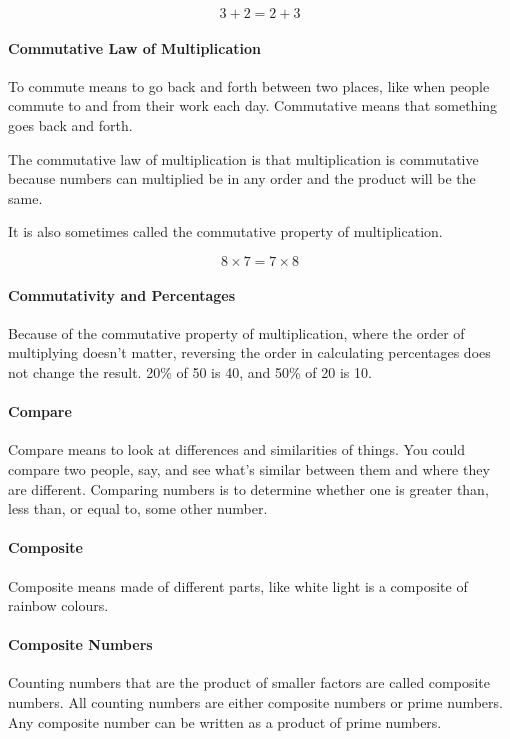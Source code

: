 \documentclass[12pt]{article}
\begin{document}
$$3+2=2+3$$

\paragraph{Commutative Law of Multiplication}

To commute means to go back and forth between two places, like when people commute to and from their work each day. Commutative means that something goes back and forth.

The commutative law of multiplication is that multiplication is commutative because numbers can multiplied be in any order and the product will be the same.

It is also sometimes called the commutative property of multiplication.

$$8 \times 7 = 7\times 8$$

\paragraph{Commutativity and Percentages}
Because of the commutative property of multiplication, where the order of multiplying doesn't matter, reversing the order in calculating percentages does not change the result. 20\% of 50 is 40, and 50\% of 20 is 10.

\paragraph{Compare} Compare means to look at differences and similarities of things. You could compare two people, say, and see what's similar between them and where they are different. Comparing numbers is to determine whether one is greater than, less than, or equal to, some other number.

\paragraph{Composite}
Composite means made of different parts, like white light is a composite of rainbow colours.

\paragraph{Composite Numbers}
Counting numbers that are the product of smaller factors are called composite numbers. All counting numbers are either composite numbers or prime numbers. Any composite number can be written as a product of prime numbers.
\end{document}
